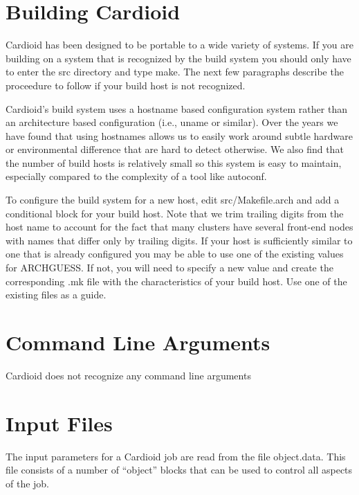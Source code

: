 \documentclass{article}
\begin{document}
\def\path#1{#1}

\section{Building Cardioid}

Cardioid has been designed to be portable to a wide variety of systems.
If you are building on a system that is recognized by the build system
you should only have to enter the src directory and type make.  The next
few paragraphs describe the proceedure to follow if your build host is
not recognized.

Cardioid's build system uses a hostname based configuration system
rather than an architecture based configuration (i.e., uname or
similar).  Over the years we have found that using hostnames allows us
to easily work around subtle hardware or environmental difference that
are hard to detect otherwise.  We also find that the number of build
hosts is relatively small so this system is easy to maintain, especially
compared to the complexity of a tool like autoconf.

To configure the build system for a new host, edit
\path{src/Makefile.arch} and add a conditional block for your build
host.  Note that we trim trailing digits from the host name to account
for the fact that many clusters have several front-end nodes with names
that differ only by trailing digits.  If your host is sufficiently
similar to one that is already configured you may be able to use one of
the existing values for ARCHGUESS.  If not, you will need to specify a
new value and create the corresponding \path{.mk} file with the
characteristics of your build host.  Use one of the existing files as a
guide.



\section{Command Line Arguments}

Cardioid does not recognize any command line arguments

\section{Input Files}

The input parameters for a Cardioid job are read from the file
\path{object.data}.  This file consists of a number of ``object'' blocks
that can be used to control all aspects of the job.
\end{document}
